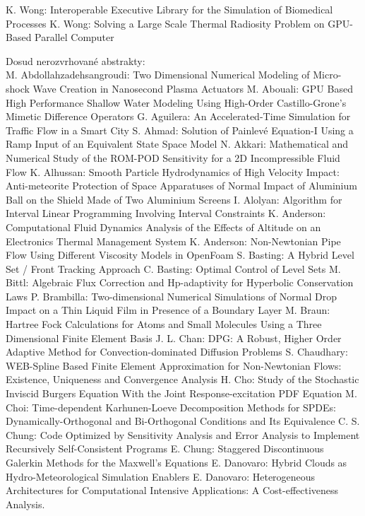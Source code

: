 \documentclass[10pt, A4]{article}%
\begin{document}
{K. Wong}: {Interoperable Executive Library for the Simulation of Biomedical Processes}
{K. Wong}: {Solving a Large Scale Thermal Radiosity Problem on GPU-Based Parallel Computer}

\newpage
Dosud nerozvrhované abstrakty:\\
{M. Abdollahzadehsangroudi}: {Two Dimensional Numerical Modeling of Micro-shock Wave Creation in Nanosecond Plasma Actuators}
{M. Abouali}: {GPU Based High Performance Shallow Water Modeling Using High-Order Castillo-Grone's Mimetic Difference Operators}
{G. Aguilera}: {An Accelerated-Time Simulation for Traffic Flow in a Smart City}
{S. Ahmad}: {Solution of Painlevé Equation-I Using a Ramp Input of an Equivalent State Space Model}
{N. Akkari}: {Mathematical and Numerical Study of the ROM-POD Sensitivity for a 2D Incompressible Fluid Flow}
{K. Alhussan}: {Smooth Particle Hydrodynamics of High Velocity Impact: Anti-meteorite Protection of Space Apparatuses of Normal Impact of Aluminium Ball on the Shield Made of Two Aluminium Screens}
{I. Alolyan}: {Algorithm for Interval Linear  Programming Involving Interval Constraints}
{K. Anderson}: {Computational Fluid Dynamics Analysis of the Effects of Altitude on an Electronics Thermal Management System}
{K. Anderson}: {Non-Newtonian Pipe Flow Using Different Viscosity Models in OpenFoam}
{S. Basting}: {A Hybrid Level Set / Front Tracking Approach}
{C. Basting}: {Optimal Control of Level Sets}
{M. Bittl}: {Algebraic Flux Correction and Hp-adaptivity for Hyperbolic Conservation Laws}
{P. Brambilla}: {Two-dimensional Numerical Simulations of Normal Drop Impact on a Thin Liquid Film in Presence of a Boundary Layer}
{M. Braun}: {Hartree Fock Calculations for Atoms and Small Molecules Using  a Three Dimensional  Finite Element Basis}
{J. L. Chan}: {DPG: A Robust, Higher Order Adaptive Method for Convection-dominated Diffusion Problems}
{S. Chaudhary}: {WEB-Spline Based Finite Element Approximation for Non-Newtonian Flows: Existence, Uniqueness and Convergence Analysis}
{H. Cho}: {Study of the Stochastic Inviscid Burgers Equation With the Joint Response-excitation PDF Equation}
{M. Choi}: {Time-dependent Karhunen-Loeve Decomposition Methods for SPDEs: Dynamically-Orthogonal and Bi-Orthogonal Conditions and Its Equivalence}
{C. S. Chung}: {Code Optimized by Sensitivity Analysis and Error Analysis to Implement Recursively Self-Consistent Programs}
{E. Chung}: {Staggered Discontinuous Galerkin Methods for the Maxwell's Equations}
{E. Danovaro}: {Hybrid Clouds as Hydro-Meteorological Simulation Enablers}
{E. Danovaro}: {Heterogeneous Architectures for Computational Intensive Applications: A Cost-effectiveness Analysis.}
\end{document}
